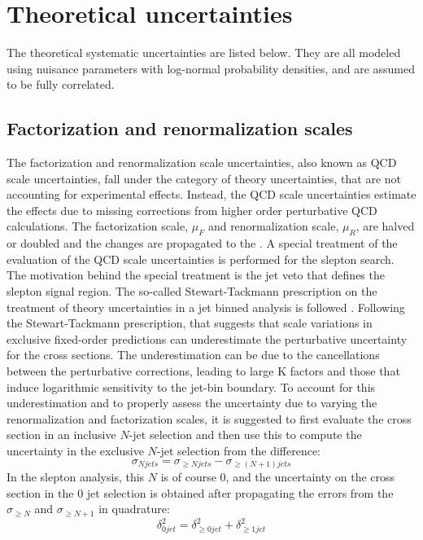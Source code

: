 \section{Theoretical uncertainties}
\noindent\justify
The theoretical systematic uncertainties are listed below. 
They are all modeled using nuisance parameters with log-normal probability densities, and are assumed to be fully correlated.
\subsection*{Factorization and renormalization scales} 
\noindent\justify
The factorization and renormalization scale uncertainties, also known as QCD scale uncertainties, fall under the category of theory uncertainties, that are not accounting for experimental effects. 
Instead, the QCD scale uncertainties estimate the effects due to missing corrections from higher order perturbative QCD calculations. 
The factorization scale, $\mu_{F}$ and renormalization scale, $\mu_{R}$, are halved or doubled and the changes are propagated to the \ptmiss. 
A special treatment of the evaluation of the QCD scale uncertainties is performed for the slepton search. 
The motivation behind the special treatment is the jet veto that defines the slepton signal region. 
The so-called Stewart-Tackmann prescription on the treatment of theory uncertainties in a jet binned analysis is followed \cite{Stewart:2011cf}. 
Following the Stewart-Tackmann prescription, that suggests that scale variations in exclusive fixed-order predictions can underestimate the perturbative uncertainty for the cross sections. 
The underestimation can be due to the cancellations between the perturbative corrections, leading to large K factors and those that induce logarithmic sensitivity to the jet-bin boundary. 
To account for this underestimation and to properly assess the uncertainty due to varying the renormalization and factorization scales, it is suggested to first evaluate the cross section in an inclusive $N$-jet selection and then use this to compute the uncertainty in the exclusive $N$-jet selection from the difference:
\begin{equation}
    \sigma_{N jets} = \sigma_{\geq N jets} - \sigma_{\geq (N+1) jets}
\end{equation}
In the slepton analysis, this $N$ is of course 0, and the uncertainty on the cross section in the 0 jet selection is obtained after propagating the errors from the $ \sigma_{\geq N}$ and
$\sigma_{\geq N+1}$ in quadrature:
\begin{equation}
    \delta_{0 jet}^{2} = \delta_{\geq 0 jet}^{2} + \delta_{\geq 1 jet}^{2}
\end{equation}
